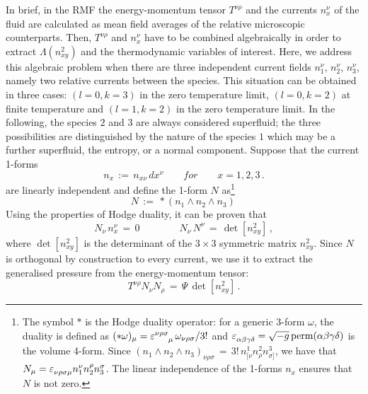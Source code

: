 \documentclass[usenatbib]{mnras}
\begin{document}
In brief, in the RMF  the energy-momentum tensor $T^{\nu \rho}$ and the currents $n_x^\nu $ of the fluid are calculated as mean field averages of the relative microscopic counterparts. Then, $T^{\nu \rho}$ and $n^\nu_x$ have to be combined algebraically in order to extract $\Lambda(n_{xy}^2)$ and the thermodynamic variables of interest.
Here, we address this algebraic problem when there are three independent current fields $n_1^\nu$, $n_2^\nu$, $n_3^\nu$, namely two relative currents between the species. This situation can be obtained in three cases: $(l=0,k=3)$ in the zero temperature limit, $(l=0,k=2)$ at finite temperature and $(l=1,k=2)$ in the zero temperature limit. In the following, the species $2$ and $3$ are always considered superfluid; the three possibilities are distinguished by the nature of the species $1$ which may be a further superfluid, the entropy, or a normal component.
Suppose that the current 1-forms
%
\begin{equation}
n_x \, := \, n_{x\nu} \, dx^\nu  
\qquad for  \qquad
x = 1,2,3 \,.
\end{equation}
%
are linearly independent and define the 1-form $N$ as\footnote{
The symbol $*$ is the Hodge duality operator: for a generic 3-form $\omega$, the duality is defined as
$(*\omega)_\mu = \varepsilon\indices{^{\nu\rho\sigma}_{\mu}} \,  \omega_{\nu\rho\sigma} /3!$ and $\varepsilon\indices{_{\alpha\beta\gamma\delta}} = \sqrt{-g} \, \text{perm}(\alpha\beta\gamma\delta)$ is the volume 4-form. 
Since $(n_1 \wedge n_2 \wedge n_3)_{\nu\rho\sigma} \, = \, 3! \, n^1_{[\nu}n^2_{\rho}n^3_{\sigma]}$, we have that $N_\mu = \varepsilon\indices{_{\nu\rho\sigma\mu}} n_1^\nu n_2^\rho n_3^\sigma$.
The linear independence of the 1-forms $n_x$ ensures that $N$ is not zero.
}
%
\begin{equation}
N \, := \, *(n_1 \wedge n_2 \wedge n_3) \,  
\end{equation}
%
Using the properties of Hodge duality, it can be proven that
%
\begin{equation}
N_\nu \, n_x^\nu  \, =\, 0 
\qquad \qquad
N_\nu \, N^\nu \,=\,  \det[n_{xy}^2] \,,
\end{equation}
%
where $ \det[n_{xy}^2]$  is the determinant of the $3 \times 3$ symmetric matrix $n_{xy}^2$. 
Since $N$ is orthogonal by construction  to every current, we use it to extract the generalised pressure from the energy-momentum tensor:
%
\begin{equation}
T^{\nu \rho} N_\nu N_\rho  \,=\, \Psi \, \det[n_{xy}^2] \, .
\end{equation}
\end{document}
